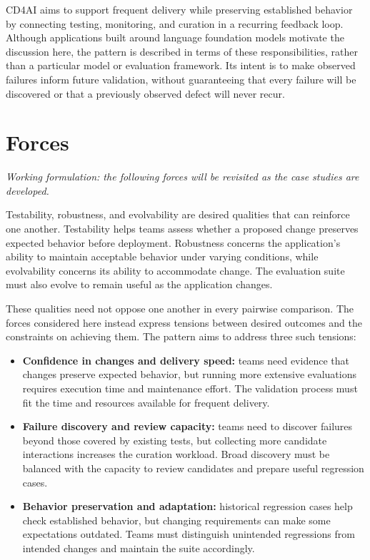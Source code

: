 
CD4AI aims to support frequent delivery while preserving established behavior
by connecting testing, monitoring, and curation in a recurring feedback loop.
Although applications built around language foundation models motivate the
discussion here, the pattern is described in terms of these responsibilities,
rather than a particular model or evaluation framework. Its intent is to make
observed failures inform future validation, without guaranteeing that every
failure will be discovered or that a previously observed defect will never recur.

\section{Forces}
\label{sec:cd4ai-forces}

\noindent\emph{Working formulation: the following forces will be revisited
as the case studies are developed.}

Testability, robustness, and evolvability are desired qualities that can
reinforce one another. Testability helps teams assess whether a proposed change
preserves expected behavior before deployment. Robustness concerns the
application's ability to maintain acceptable behavior under varying conditions,
while evolvability concerns its ability to accommodate change. The evaluation
suite must also evolve to remain useful as the application changes.

These qualities need not oppose one another in every pairwise comparison.
The forces considered here instead express tensions between desired outcomes
and the constraints on achieving them. The pattern aims to address three
such tensions:

\begin{itemize}
  \item \textbf{Confidence in changes and delivery speed:} teams need evidence
    that changes preserve expected behavior, but running more extensive
    evaluations requires execution time and maintenance effort. The validation
    process must fit the time and resources available for frequent delivery.
  \item \textbf{Failure discovery and review capacity:} teams need to discover
    failures beyond those covered by existing tests, but collecting more
    candidate interactions increases the curation workload. Broad discovery
    must be balanced with the capacity to review candidates and prepare useful
    regression cases.
  \item \textbf{Behavior preservation and adaptation:} historical regression
    cases help check established behavior, but changing requirements can make
    some expectations outdated. Teams must distinguish unintended regressions
    from intended changes and maintain the suite accordingly.
\end{itemize}

